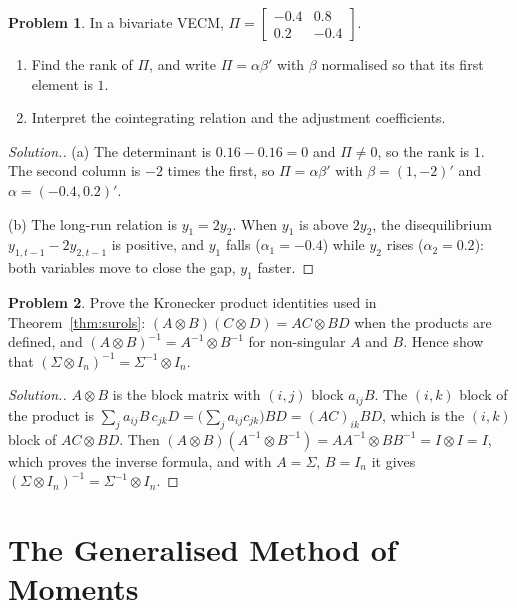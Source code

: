 \documentclass[11pt,a4paper]{article}
\numberwithin{equation}{section}
\theoremstyle{definition}
\newtheorem{problemx}{Problem}[subsection]
\newenvironment{problem}{\begin{problemx}}{\end{problemx}}
\newenvironment{solution}
  {\renewcommand{\qedsymbol}{}\begin{proof}[\textit{Solution}.]}
  {\end{proof}}
\begin{document}
\begin{problem}
In a bivariate VECM, $\Pi = \begin{bmatrix} -0.4 & 0.8\\ 0.2 & -0.4\end{bmatrix}$.
\begin{enumerate}[label=(\alph*)]
\item Find the rank of $\Pi$, and write $\Pi = \alpha\beta'$ with $\beta$ normalised so that its first element is $1$.
\item Interpret the cointegrating relation and the adjustment coefficients.
\end{enumerate}
\end{problem}

\begin{solution}
(a) The determinant is $0.16 - 0.16 = 0$ and $\Pi \neq 0$, so the rank is $1$. The second column is $-2$ times the first, so $\Pi = \alpha\beta'$ with $\beta = (1, -2)'$ and
$\alpha = (-0.4, 0.2)'$.

(b) The long-run relation is $y_1 = 2y_2$. When $y_1$ is above $2y_2$, the disequilibrium $y_{1,t-1} - 2y_{2,t-1}$ is positive, and $y_1$ falls ($\alpha_1 = -0.4$) while $y_2$ rises
($\alpha_2 = 0.2$): both variables move to close the gap, $y_1$ faster.
\end{solution}

\begin{problem}
Prove the Kronecker product identities used in Theorem~\ref{thm:surols}: $(A \otimes B)(C \otimes D) = AC \otimes BD$ when the products are defined, and
$(A \otimes B)^{-1} = A^{-1} \otimes B^{-1}$ for non-singular $A$ and $B$. Hence show that $(\Sigma \otimes I_n)^{-1} = \Sigma^{-1} \otimes I_n$.
\end{problem}

\begin{solution}
$A \otimes B$ is the block matrix with $(i, j)$ block $a_{ij}B$. The $(i, k)$ block of the product is $\sum_ja_{ij}B\,c_{jk}D = \bigl(\sum_ja_{ij}c_{jk}\bigr)BD = (AC)_{ik}BD$, which is the $(i, k)$ block of
$AC \otimes BD$. Then $(A \otimes B)(A^{-1} \otimes B^{-1}) = AA^{-1} \otimes BB^{-1} = I \otimes I = I$, which proves the inverse formula, and with $A = \Sigma$, $B = I_n$ it gives $(\Sigma \otimes I_n)^{-1} = \Sigma^{-1} \otimes I_n$.
\end{solution}

\section{The Generalised Method of Moments}
\label{sec:gmm}
\end{document}
